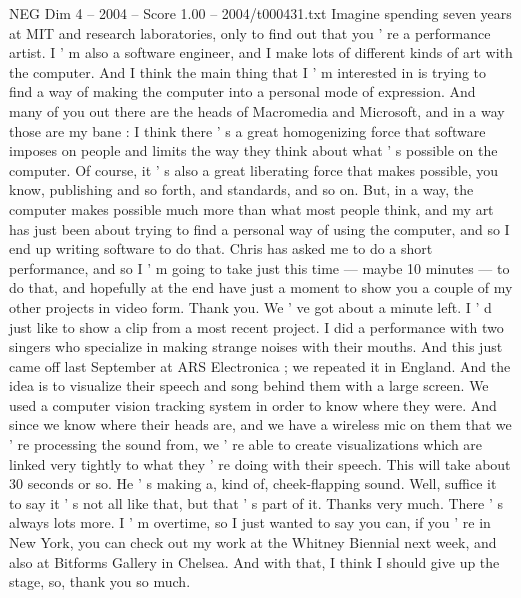 \begin{textsample}{NEG Dim 4 – 2004 – Score 1.00 – 2004/t000431.txt}  \label{ex:f4_neg_024}
Imagine spending seven years at MIT and research laboratories, only to find out that you ' re a performance artist.
I ' m also a software engineer, and I make lots of different kinds of art with the computer.
And I think the main thing that I ' m interested in is trying to find a way of making the computer into a personal mode of expression.
And many of you out there are the heads of Macromedia and Microsoft, and in a way those are my bane : I think there ' s a great homogenizing force that software imposes on people and limits the way they think about what ' s possible on the computer.
Of course, it ' s also a great liberating force that makes possible, you know, publishing and so forth, and standards, and so on.
But, in a way, the computer makes possible much more than what most people think, and my art has just been about trying to find a personal way of using the computer, and so I end up writing software to do that.
Chris has asked me to do a short performance, and so I ' m going to take just this time — maybe 10 minutes — to do that, and hopefully at the end have just a moment to show you a couple of my other projects in video form.
Thank you.
We ' ve got about a minute left.
I ' d just like to show a clip from a most recent project.
I did a performance with two singers who specialize in making strange noises with their mouths.
And this just came off last September at ARS Electronica ; we repeated it in England.
And the idea is to visualize their speech and song behind them with a large screen.
We used a computer vision tracking system in order to know where they were.
And since we know where their heads are, and we have a wireless mic on them that we ' re processing the sound from, we ' re able to create visualizations which are linked very tightly to what they ' re doing with their speech.
This will take about 30 seconds or so.
He ' s making a, kind of, cheek-flapping sound.
Well, suffice it to say it ' s not all like that, but that ' s part of it.
Thanks very much.
There ' s always lots more.
I ' m overtime, so I just wanted to say you can, if you ' re in New York, you can check out my work at the Whitney Biennial next week, and also at Bitforms Gallery in Chelsea.
And with that, I think I should give up the stage, so, thank you so much.

\end{textsample}

